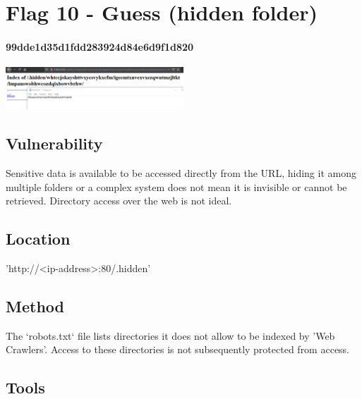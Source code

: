 \section{Flag 10 - Guess (hidden folder)}

\paragraph{99dde1d35d1fdd283924d84e6d9f1d820}
\begin{center}
    \includegraphics[width=0.5\textwidth]{13.Flag10/10-04.png}\\[0cm] 
\end{center}

\subsection{Vulnerability}

Sensitive data is available to be accessed directly from the URL, hiding it among multiple folders or a complex system does not mean it is invisible or cannot be retrieved. Directory access over the web is not ideal.

\subsection{Location}

'http://<ip-address>:80/.hidden'

\subsection{Method}

The `robots.txt` file lists directories it does not allow to be indexed by 'Web Crawlers'. Access to these directories is not subsequently protected from access.

\subsection{Tools}

